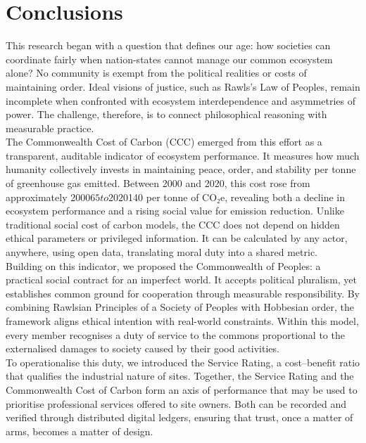 \documentclass[12pt, oneside]{article}   	%
\begin{document}
\section{Conclusions}

This research began with a question that defines our age: how societies can coordinate fairly when nation-states cannot manage our common ecosystem alone?
No community is exempt from the political realities or costs of maintaining order.
Ideal visions of justice, such as Rawls’s Law of Peoples, remain incomplete when confronted with ecosystem interdependence and asymmetries of power.
The challenge, therefore, is to connect philosophical reasoning with measurable practice.\\

The Commonwealth Cost of Carbon (CCC) emerged from this effort as a transparent, auditable indicator of ecosystem performance.
It measures how much humanity collectively invests in maintaining peace, order, and stability per tonne of greenhouse gas emitted.
Between 2000 and 2020, this cost rose from approximately 2000$65 to 2020$140 per tonne of CO₂e, revealing both a decline in ecosystem performance and a rising social value for emission reduction.
Unlike traditional social cost of carbon models, the CCC does not depend on hidden ethical parameters or privileged information.
It can be calculated by any actor, anywhere, using open data, translating moral duty into a shared metric.\\

Building on this indicator, we proposed the Commonwealth of Peoples: a practical social contract for an imperfect world.
It accepts political pluralism, yet establishes common ground for cooperation through measurable responsibility.
By combining Rawlsian Principles of a Society of Peoples with Hobbesian order, the framework aligns ethical intention with real-world constraints.
Within this model, every member recognises a duty of service to the commons proportional to the externalised damages to society caused by their good activities.\\

To operationalise this duty, we introduced the Service Rating, a cost–benefit ratio that qualifies the industrial nature of sites.
Together, the Service Rating and the Commonwealth Cost of Carbon form an axis of performance that may be used to prioritise professional services offered to site owners.
Both can be recorded and verified through distributed digital ledgers, ensuring that trust, once a matter of arms, becomes a matter of design.\\
\end{document}
